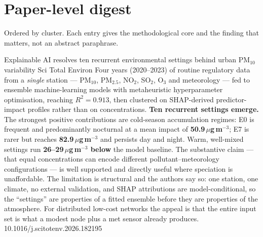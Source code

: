 \documentclass[10pt]{article}
\begin{document}
\clearpage

\section*{\sffamily\bfseries\color{Deep}Paper-level digest}
\vspace{-1.5mm}{\color{Amber}\rule{\linewidth}{1.1pt}}\vspace{1mm}

{\fontsize{7.4}{9}\selectfont\color{Slate}Ordered by cluster. Each entry gives the
methodological core and the finding that matters, not an abstract paraphrase.\par}


{Explainable AI resolves ten recurrent environmental settings behind urban PM$_{10}$ variability}
{Sci Total Environ}
{Four years (2020--2023) of routine regulatory data from a \emph{single} station ---
PM$_{10}$, PM$_{2.5}$, NO$_2$, SO$_2$, O$_3$ and meteorology --- fed to ensemble
machine-learning models with metaheuristic hyperparameter optimisation, reaching
\textbf{$R^2 = 0.913$}, then clustered on SHAP-derived predictor-impact profiles rather
than on concentrations. \textbf{Ten recurrent settings emerge.} The strongest positive
contributions are cold-season accumulation regimes: E0 is frequent and predominantly
nocturnal at a mean impact of \textbf{50.9\,$\mu$g\,m$^{-3}$}; E7 is rarer but reaches
\textbf{82.9\,$\mu$g\,m$^{-3}$} and persists day and night. Warm, well-mixed settings run
\textbf{26--29\,$\mu$g\,m$^{-3}$ below} the model baseline. The substantive claim --- that
equal concentrations can encode different pollutant--meteorology configurations --- is well
supported and directly useful where speciation is unaffordable. The limitation is
structural and the authors say so: one station, one climate, no external validation, and
SHAP attributions are model-conditional, so the ``settings'' are properties of a fitted
ensemble before they are properties of the atmosphere. For distributed low-cost networks
the appeal is that the entire input set is what a modest node plus a met sensor already
produces.}
{10.1016/j.scitotenv.2026.182195}
\end{document}
